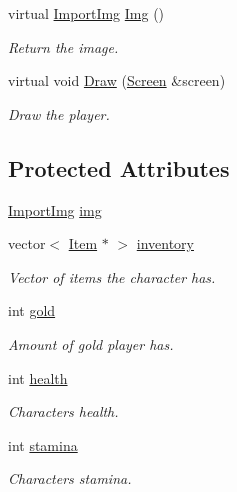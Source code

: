 \begin{DoxyCompactItemize}
virtual \hyperlink{classImportImg}{Import\-Img} \hyperlink{classCharacter_a755c751849b867d7b42e9f87e1bfde6e}{Img} ()
\begin{DoxyCompactList}\small\item\em Return the image. \end{DoxyCompactList}\item 
virtual void \hyperlink{classCharacter_a2194329f9956a07b9e3dc021da93358e}{Draw} (\hyperlink{classScreen}{Screen} \&screen)
\begin{DoxyCompactList}\small\item\em Draw the player. \end{DoxyCompactList}\end{DoxyCompactItemize}
\subsection*{Protected Attributes}
\begin{DoxyCompactItemize}
\item 
\hyperlink{classImportImg}{Import\-Img} \hyperlink{classCharacter_a3a0a90b2a43858b259912f659b8e0eea}{img}
\item 
vector$<$ \hyperlink{classItem}{Item} $\ast$ $>$ \hyperlink{classCharacter_ade4db4a453cc96bedbf3a385a10291fa}{inventory}
\begin{DoxyCompactList}\small\item\em Vector of items the character has. \end{DoxyCompactList}\item 
int \hyperlink{classCharacter_ab8dd866071dba429a35555e0c372e162}{gold}
\begin{DoxyCompactList}\small\item\em Amount of gold player has. \end{DoxyCompactList}\item 
int \hyperlink{classCharacter_a69c649b8febd22729e6edafb27e69aeb}{health}
\begin{DoxyCompactList}\small\item\em Characters health. \end{DoxyCompactList}\item 
int \hyperlink{classCharacter_a0f17daa14530e07f0ca479c2dd97f38b}{stamina}
\begin{DoxyCompactList}\small\item\em Characters stamina. \end{DoxyCompactList}\end{DoxyCompactItemize}



